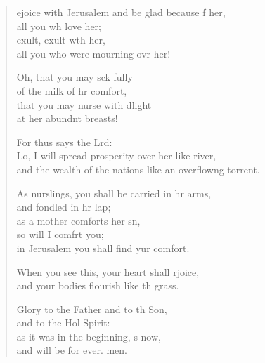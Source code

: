 \begin{verse}
  \begin{patverse}
ejoice with Jerusalem and be glad because f her,\Med\\
all you wh love her;\\
exult, exult w\pointup{\i}th her,\Med\\
all you who were mourning ovr her!

Oh, that you may sck fully\Med\\
of the milk of hr comfort,\\
that you may nurse with dlight\Med\\
at her abundnt breasts!

For thus says the Lrd:\Flex\\
Lo, I will spread prosperity over her like  river,\Med\\
and the wealth of the nations like an overflow\pointup{\i}ng torrent.

As nurslings, you shall be carried in hr arms,\Med\\
and fondled in hr lap;\\
as a mother comforts her sn,\Flex\\
so will I comfrt you;\Med\\
in Jerusalem you shall find yur comfort.

When you see this, your heart shall rjoice,\Med\\
and your bodies flourish like th grass.

Glory to the Father and to th Son,\Med\\
and to the Hol Spirit:\\
as it was in the beginning, \pointup{\i}s now,\Med\\
and will be for ever. men.
  \end{patverse}
\end{verse}
